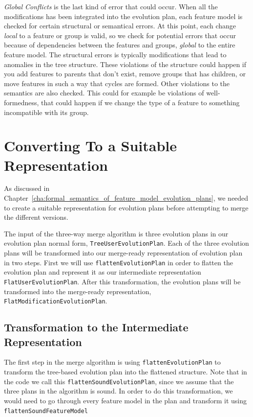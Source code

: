 \documentclass[a4paper,english]{ifimaster}
\begin{document}
\textit{Global Conflicts} is the last kind of error that could occur. When all the modifications has been integrated into the evolution plan, each feature model is checked for certain structural or semantical errors. At this point, each change \textit{local} to a feature or group is valid, so we check for potential errors that occur because of dependencies between the features and groups, \textit{global} to the entire feature model. The structural errors is typically modifications that lead to anomalies in the tree structure. These violations of the structure could happen if you add features to parents that don't exist, remove groups that has children, or move features in such a way that cycles are formed. Other violations to the semantics are also checked. This could for example be violations of well-formedness, that could happen if we change the type of a feature to something incompatible with its group.

\section{Converting To a Suitable Representation}%
\label{sec:converting_to_a_suitable_representation}

As discussed in Chapter~\ref{cha:formal_semantics_of_feature_model_evolution_plans}, we needed to create a suitable representation for evolution plans before attempting to merge the different versions.

The input of the three-way merge algorithm is three evolution plans in our evolution plan normal form, \texttt{TreeUserEvolutionPlan}. Each of the three evolution plans will be transformed into our merge-ready representation of evolution plan in two steps. First we will use \texttt{flattenEvolutionPlan} in order to flatten the evolution plan and represent it as our intermediate representation \texttt{FlatUserEvolutionPlan}. After this transformation, the evolution plans will be transformed into the merge-ready representation, \texttt{FlatModificationEvolutionPlan}.

\subsection{Transformation to the Intermediate Representation}%
\label{sub:transformation_to_the_intermediate_representation}

The first step in the merge algorithm is using \texttt{flattenEvolutionPlan} to transform the tree-based evolution plan into the flattened structure. Note that in the code we call this \texttt{flattenSoundEvolutionPlan}, since we assume that the three plans in the algorithm is sound. In order to do this transformation, we would need to go through every feature model in the plan and transform it using \texttt{flattenSoundFeatureModel}
\end{document}
